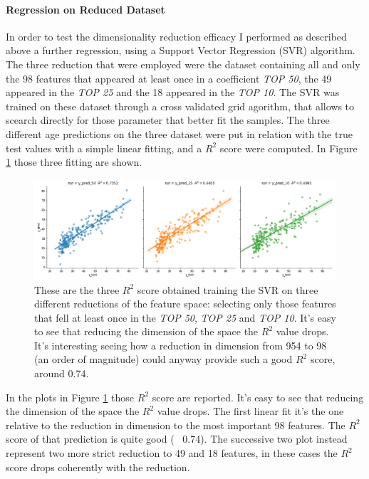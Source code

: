\documentclass{article}
\begin{document}
\paragraph{Regression on Reduced Dataset}
In order to test the dimensionality reduction efficacy I performed as described above a further regression, using a Support Vector Regression (SVR) algorithm. The three reduction that were employed were the dataset containing all and only the 98 features that appeared at least once in a coefficient \emph{TOP 50}, the 49 appeared in the \emph{TOP 25} and the 18 appeared in the \emph{TOP 10}.
The SVR was trained on these dataset through a cross validated grid agorithm, that allows to scearch directly for those parameter that better fit the samples. The three different age predictions on the three dataset were put in relation with the true test values with a simple linear fitting, and a $R^2$ score were computed. In Figure \ref{fig:Brain_graphs} those three fitting are shown.

\begin{figure}[h]
	\includegraphics[width=\textwidth]{three_graphs}
	\caption{These are the three $R^2$ score obtained training the SVR on three different reductions of the feature space: selecting only those features that fell at least once in the \emph{TOP 50}, \emph{TOP 25} and \emph{TOP 10}. It's easy to see that reducing the dimension of the space the $R^2$ value drops. It's interesting seeing how a reduction in dimension from 954 to 98 (an order of magnitude) could anyway provide such a good $R^2$ score, around 0.74.}
	\label{fig:Brain_graphs}
	\centering
\end{figure}

In the plots in Figure \ref{fig:Brain_graphs} those $R^2$ score are reported. It's easy to see that reducing the dimension of the space the $R^2$ value drops. The first linear fit it's the one relative to the reduction in dimension to the most important 98 features. The $R^2$ score of that prediction is quite good (~ 0.74). The successive two plot instead represent two more strict reduction to 49 and 18 features, in these cases the $R^2$ score drops coherently with the reduction.
\end{document}
